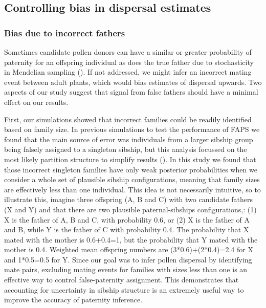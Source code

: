 \documentclass[10pt, a4paper, twocolumn]{article} %
\begin{document}
\subsection{Controlling bias in dispersal estimates}

\subsubsection{Bias due to incorrect fathers}

Sometimes candidate pollen donors can have a similar or greater probability of paternity for an offspring individual as does the true father due to stochasticity in Mendelian sampling (\cite{thompson1976paradox}).
If not addressed, we might infer an incorrect mating event between adult plants, which would bias estimates of dispersal upwards.
Two aspects of our study suggest that signal from false fathers should have a minimal effect on our results.

First, our simulations showed that incorrect families could be readily identified based on family size.
In previous simulations to test the performance of FAPS we found that the main source of error was individuals from a larger sibship group being falsely assigned to a singleton sibship, but this analysis focussed on the most likely partition structure to simplify results (\cite{ellis2018efficient}).
In this study we found that those incorrect singleton families have only weak posterior probabilities when we consider a whole set of plausible sibship configurations, meaning that family sizes are effectively less than one individual.
This idea is not necessarily intuitive, so to illustrate this, imagine three offspring (A, B and C) with two candidate fathers (X and Y) and that there are two plausible paternal-sibships configurations,: (1) X is the father of A, B and C, with probability 0.6, or (2) X is the father of A and B, while Y is the father of C with probability 0.4.
The probability that X mated with the mother is 0.6+0.4=1, but the probability that Y mated with the mother is 0.4.
Weighted mean offspring numbers are (3*0.6)+(2*0.4)=2.4 for X and 1*0.5=0.5 for Y.
Since our goal was to infer pollen dispersal by identifying mate pairs, excluding mating events for families with sizes less than one is an effective way to control false-paternity assignment.
This demonstrates that accounting for uncertainty in sibship structure is an extremely useful way to improve the accuracy of paternity inference.
\end{document}
